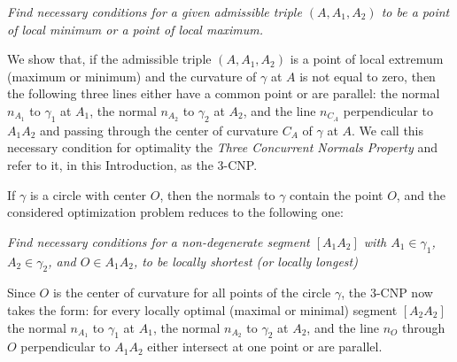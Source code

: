 \documentclass[a4paper,12pt]{amsart}
\def\g{\gamma}
\begin{document}
\medskip

{\it  Find necessary conditions for a given admissible
triple $(A, A_1, A_2)$ to be a point of local minimum or a point of local maximum.}

\medskip

We show that, if the admissible triple
$(A, A_1,A_2)$ is a point of local
extremum  (maximum or minimum)
and the curvature of $\g$ at $A$ is not equal to zero, then the following three
lines either have a common point or are parallel: the normal $n_{A_1}$ to
$\g_1$ at $A_1$, the normal $n_{A_2}$ to $\g_2$ at $A_2$, and the line
$n_{C_{A}}$ perpendicular to $A_1A_2$ and passing through the center of curvature $C_{A}$ of $\g$ at $A$. We call this necessary condition for optimality the {\it Three Concurrent Normals Property} and refer to it, in this Introduction, as the 3-CNP.

\medskip

If $\g$ is a circle
with center  $O$, then the normals to $\g$ contain the point $O$, and the considered optimization problem reduces to the following one:

\medskip

{\it Find necessary conditions for a non-degenerate segment
$[A_1A_2]$ with $A_1\in\g_1$, $A_2\in\g_2$,
and $O \in A_1A_2$, to be locally shortest (or locally longest)}

\medskip

\noindent Since $O$ is the center of curvature for all points of the circle $\g$, the 3-CNP now takes the form: for every locally optimal  (maximal or minimal) segment
$[A_2A_2]$ the normal $n_{A_1}$ to
$\g_1$ at $A_1$, the normal $n_{A_2}$ to $\g_2$ at $A_2$, and the line $n_O$ through $O$
perpendicular to $A_1A_2$ either intersect at one point or are parallel.
\end{document}
